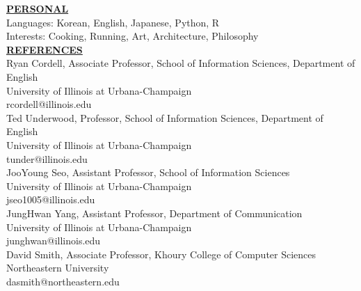 \documentclass{article}
\begin{document}
\noindent \textbf{\underline{PERSONAL}} \\
\noindent Languages: Korean, English, Japanese, Python, R \\
\noindent Interests: Cooking, Running, Art, Architecture, Philosophy \\

\noindent \textbf{\underline{REFERENCES}} \\
\noindent Ryan Cordell, Associate Professor, School of Information Sciences, Department of English \\ 
University of Illinois at Urbana-Champaign \\
rcordell@illinois.edu \\

\noindent Ted Underwood, Professor, School of Information Sciences, Department of English \\
University of Illinois at Urbana-Champaign \\
tunder@illinois.edu \\

\noindent JooYoung Seo, Assistant Professor, School of Information Sciences \\
University of Illinois at Urbana-Champaign \\
jseo1005@illinois.edu \\

\noindent JungHwan Yang, Assistant Professor, Department of Communication \\
University of Illinois at Urbana-Champaign \\
junghwan@illinois.edu \\

\noindent David Smith, Associate Professor, Khoury College of Computer Sciences \\
Northeastern University \\
dasmith@northeastern.edu \\
\end{document}

